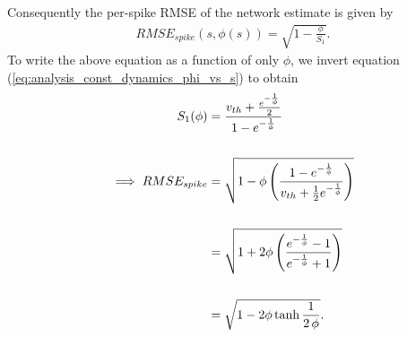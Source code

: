 \begin{enumerate}
Consequently the per-spike RMSE of the network estimate is given by 
\begin{align}
\label{eq:analysis:const_dynamics_per_spike_rmse_phi_s}
RMSE_{spike}(s, \phi(s)) = \sqrt
{
	1 - 
	\frac
	{
		\phi
	}
	{
		S_1
	}
}.
\end{align}
To write the above equation as a function of only $\phi$, we invert equation (\ref{eq:analysis_const_dynamics_phi_vs_s}) to obtain 
\begin{align}
\label{eq:analysis:const_dynamics_per_spike_rmse_phi}
S_1(\phi) &= 
\frac
{
	v_{th} +
	\frac
	{
		e^
		{
			-\frac
			{
				1
			}
			{
				\phi
			}
		}
	}
	{
		2
	}
}
{
	1 - e^
	{
		-\frac
		{
			1
		}
		{
			\phi
		}
	}
}
\notag
%
\\
\notag
\\
%
\implies
RMSE_{spike} 
&= 
\sqrt
{
	1 - \phi 
	\left(
		\frac
		{
			1 - e^
			{
				-\frac
				{
					1	
				}
				{
					\phi
				}
			}
		}
		{
			v_{th} + 
			\frac
			{
				1
			}
			{
				2
			}
			e^
			{
				-\frac
				{
					1
				}
				{
					\phi
				}
			}
		}
	\right)
} \notag
%
%
\\  
\notag
\\
\notag
%
%
&= 
\sqrt
{
	1 + 2 \phi 
	\left(
		\frac
		{
			e^
			{
				-\frac
				{
					1	
				}
				{
					\phi
				}
			}
			- 1
		}
		{
			e^
			{
				-\frac
				{
					1
				}
				{
					\phi
				}
			}
			+ 1
		}
	\right)
}
\notag
\\
\notag
\\
&=\sqrt
{
	1 - 2 \phi
	\tanh
	{
		\frac
		{
			1
		}
		{
			2 \, \phi
		}	
	}
}.
\end{align}


\end{enumerate}

